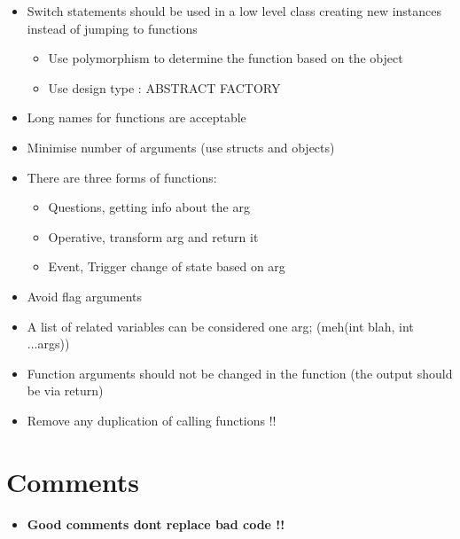 \documentclass[11pt]{scrartcl} %
\begin{document}
	\begin{itemize}

		\item Switch statements should be used in a low level class creating new instances instead of jumping to functions
		\begin{itemize}
			\item Use polymorphism to determine the function based on the object
			\item Use design type : ABSTRACT FACTORY
		\end{itemize}  
		
		\item Long names for functions are acceptable
		\item Minimise number of arguments (use structs and objects)
		
		\item There are three forms of functions:
		\begin{itemize}
			\item Questions, getting info about the arg
			\item Operative, transform arg and return it
			\item Event, Trigger change of state based on arg	  
		\end{itemize}
		
		\item  Avoid flag arguments
		\item {A list of related variables can be considered one arg; (meh(int blah, int ...args))}

		\item Function arguments should not be changed in the function (the output should be via return)
		\item Remove any duplication of calling functions !!

	\end{itemize}

\section{Comments}

\begin{itemize}
	\item \textbf{Good comments dont replace bad code !!}
\end{itemize}
\end{document}
